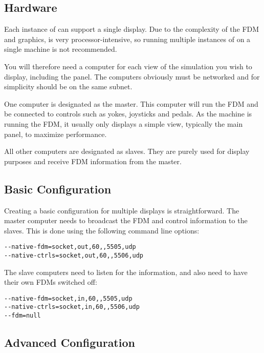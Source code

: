 \noindent
{}

\subsection{Hardware}

Each instance of \FlightGear{} can support a single display. Due to the
complexity of the FDM and graphics, \FlightGear{} is very processor-intensive,
so running multiple instances of \FlightGear{} on a single machine is not
recommended.

You will therefore need a computer for each view of the simulation you wish
to display, including the panel. The computers obviously must be networked
and for simplicity should be on the same subnet.

One computer is designated as the master. This computer will run the FDM and
be connected to controls such as yokes, joysticks and pedals. As the machine is
running the FDM, it usually only displays a simple view, typically the main
panel, to maximize performance.

All other computers are designated as slaves. They are purely used for display
purposes and receive FDM information from the master.

\subsection{Basic Configuration}

Creating a basic configuration for multiple displays is straightforward. The
master computer needs to broadcast the FDM and control information to the slaves.
This is done using the following command line options:

\begin{verbatim}
--native-fdm=socket,out,60,,5505,udp
--native-ctrls=socket,out,60,,5506,udp
\end{verbatim}

The slave computers need to listen for the information, and also need to have
their own FDMs switched off:

\begin{verbatim}
--native-fdm=socket,in,60,,5505,udp
--native-ctrls=socket,in,60,,5506,udp
--fdm=null
\end{verbatim}

\subsection{Advanced Configuration}

